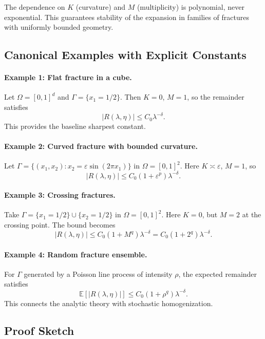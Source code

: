 \begin{remark}
The dependence on $K$ (curvature) and $M$ (multiplicity) is polynomial,
never exponential.  
This guarantees stability of the expansion in families of fractures with
uniformly bounded geometry.
\end{remark}

\subsection{Canonical Examples with Explicit Constants}

\paragraph{Example 1: Flat fracture in a cube.}
Let $\Omega=[0,1]^d$ and $\Gamma=\{x_1=1/2\}$.  
Then $K=0$, $M=1$, so the remainder satisfies
\[
|R(\lambda,\eta)| \leq C_0 \lambda^{-\delta}.
\]
This provides the baseline sharpest constant.

\paragraph{Example 2: Curved fracture with bounded curvature.}
Let $\Gamma=\{(x_1,x_2): x_2 = \varepsilon \sin(2\pi x_1)\}$ in
$\Omega=[0,1]^2$.  
Here $K\asymp \varepsilon$, $M=1$, so
\[
|R(\lambda,\eta)| \leq C_0(1+\varepsilon^p)\lambda^{-\delta}.
\]

\paragraph{Example 3: Crossing fractures.}
Take $\Gamma=\{x_1=1/2\} \cup \{x_2=1/2\}$ in $\Omega=[0,1]^2$.  
Here $K=0$, but $M=2$ at the crossing point.  
The bound becomes
\[
|R(\lambda,\eta)| \leq C_0(1+M^q)\lambda^{-\delta} = C_0(1+2^q)\lambda^{-\delta}.
\]

\paragraph{Example 4: Random fracture ensemble.}
For $\Gamma$ generated by a Poisson line process of intensity $\rho$,
the expected remainder satisfies
\[
\mathbb{E}[|R(\lambda,\eta)|] \leq C_0(1+\rho^q)\lambda^{-\delta}.
\]
This connects the analytic theory with stochastic homogenization.

\subsection{Proof Sketch}

